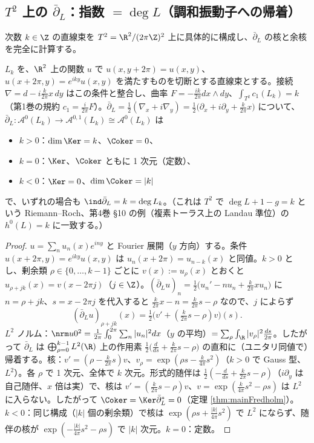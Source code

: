 \subsection{$T^2$ 上の $\bar\partial_L$：指数 $=\deg L$（調和振動子への帰着）}
次数 $k\in\Z$ の直線束を $T^2=\R^2/(2\pi\Z)^2$ 上に具体的に構成し、$\bar\partial_L$ の核と余核を完全に計算する。
\begin{thm}\label{thm:landau}\tP
$L_k$ を、$\R^2$ 上の関数 $u$ で $u(x,y+2\pi)=u(x,y)$、$u(x+2\pi,y)=e^{iky}u(x,y)$ を満たすものを切断とする直線束とする。接続 $\nabla=d-i\frac k{2\pi}x\,dy$ はこの条件と整合し、曲率 $F=-\frac{ik}{2\pi}dx\wedge dy$、$\int_{T^2}c_1(L_k)=k$（第1巻の規約 $c_1=\frac i{2\pi}F$）。$\bar\partial_L=\frac12(\nabla_x+i\nabla_y)=\frac12\bigl(\partial_x+i\partial_y+\frac k{2\pi}x\bigr)$ について、$\bar\partial_L:\mathcal A^0(L_k)\to\mathcal A^{0,1}(L_k)\cong\mathcal A^0(L_k)$ は
\begin{itemize}
\item $k>0$：$\dim\Ker=k$、$\Coker=0$、
\item $k=0$：$\Ker$、$\Coker$ ともに 1 次元（定数）、
\item $k<0$：$\Ker=0$、$\dim\Coker=|k|$
\end{itemize}
で、いずれの場合も $\ind\bar\partial_L=k=\deg L_k$。（これは $T^2$ で $\deg L+1-g=k$ という Riemann--Roch、第4巻 \S10 の例（複素トーラス上の Landau 準位）の $h^0(L)=k$ に一致する。）
\end{thm}
\begin{proof}
$u=\sum_nu_n(x)e^{iny}$ と Fourier 展開（$y$ 方向）する。条件 $u(x+2\pi,y)=e^{iky}u(x,y)$ は $u_n(x+2\pi)=u_{n-k}(x)$ と同値。$k>0$ とし、剰余類 $\rho\in\{0,\dots,k-1\}$ ごとに $v(x):=u_\rho(x)$ とおくと $u_{\rho+jk}(x)=v(x-2\pi j)$（$j\in\Z$）。$(\bar\partial_Lu)_n=\frac12\bigl(u_n'-nu_n+\frac k{2\pi}xu_n\bigr)$ に $n=\rho+jk$、$s=x-2\pi j$ を代入すると $\frac k{2\pi}x-n=\frac k{2\pi}s-\rho$ なので、$j$ によらず
\[
(\bar\partial_Lu)_{\rho+jk}(x)=\tfrac12\bigl(v'+(\tfrac k{2\pi}s-\rho)v\bigr)(s).
\]
$L^2$ ノルム：$\nrm u0^2=\frac1{2\pi}\int_0^{2\pi}\sum_n|u_n|^2dx$（$y$ の平均）$=\sum_\rho\int_{\R}|v_\rho|^2\frac{ds}{2\pi}$。したがって $\bar\partial_L$ は $\bigoplus_{\rho=0}^{k-1}L^2(\R)$ 上の作用素 $\frac12\bigl(\frac d{ds}+\frac k{2\pi}s-\rho\bigr)$ の直和に（ユニタリ同値で）帰着する。核：$v'=(\rho-\frac k{2\pi}s)v$、$v_\rho=\exp(\rho s-\frac k{4\pi}s^2)$（$k>0$ で Gauss 型、$L^2$）。各 $\rho$ で 1 次元、全体で $k$ 次元。形式的随伴は $\frac12(-\frac d{ds}+\frac k{2\pi}s-\rho)$（$i\partial_y$ は自己随伴、$x$ 倍は実）で、核は $v'=(\frac k{2\pi}s-\rho)v$、$v=\exp(\frac k{4\pi}s^2-\rho s)$ は $L^2$ に入らない。したがって $\Coker=\Ker\bar\partial_L^*=0$（定理 \ref{thm:mainFredholm}）。$k<0$：同じ構成（$|k|$ 個の剰余類）で核は $\exp(\rho s+\frac{|k|}{4\pi}s^2)$ で $L^2$ にならず、随伴の核が $\exp(-\frac{|k|}{4\pi}s^2-\rho s)$ で $|k|$ 次元。$k=0$：定数。
\end{proof}
